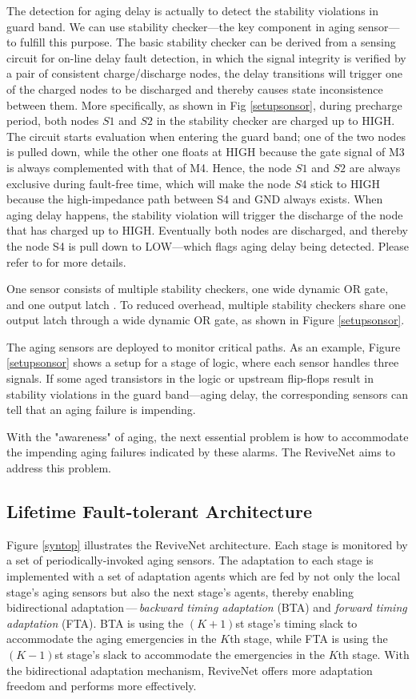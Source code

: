 The detection for aging delay is actually to detect the stability violations in guard band. We can use stability checker---the key component in aging sensor---to fulfill this purpose. The basic stability checker can be derived from a sensing circuit for on-line delay fault detection, in which the signal integrity is verified by a pair of consistent charge/discharge nodes, the delay transitions will trigger one of the charged nodes to be discharged and thereby causes state inconsistence between them. More specifically, as shown in Fig \ref{setupsonsor}, during precharge period, both nodes $S1$ and $S2$ in the stability checker are charged up to HIGH. The circuit starts evaluation when entering the guard band; one of the two nodes is pulled down, while the other one floats at HIGH because the gate signal of M3 is always complemented with that of M4. Hence, the node $S1$ and $S2$ are always exclusive during fault-free time, which will make the node $S4$ stick to HIGH because the high-impedance path between S4 and GND always exists. When aging delay happens, the stability violation will trigger the discharge of the node that has charged up to HIGH. Eventually both nodes are discharged, and thereby the node S4 is pull down to LOW---which flags aging delay being detected. Please refer to \cite{SVFD_09} for more details.

One sensor consists of multiple stability checkers, one wide dynamic OR gate, and one output latch \cite{SVFD_09}. To reduced overhead, multiple stability checkers share one output latch through a wide dynamic OR gate, as shown in Figure \ref{setupsonsor}.

The aging sensors are deployed to monitor critical paths. As an example, Figure \ref{setupsonsor} shows a setup for a stage of logic, where each sensor handles three signals. If some aged transistors in the logic or upstream flip-flops result in stability violations in the guard band---aging delay, the corresponding sensors can tell that an aging failure is impending.

With the "awareness" of aging, the next essential problem is how to accommodate the impending aging failures indicated by these alarms. The ReviveNet aims to address this problem.

\subsection{Lifetime Fault-tolerant Architecture}

Figure \ref{syntop} illustrates the ReviveNet architecture. Each stage is monitored by a set of periodically-invoked aging sensors. The adaptation to each stage is implemented with a set of adaptation agents which are fed by not only the local stage's aging sensors but also the next stage's agents, thereby enabling bidirectional adaptation\,---\,\emph{backward timing adaptation} (BTA) and \emph{forward timing adaptation} (FTA).  BTA is using the $(K+1)$st stage's timing slack to accommodate the aging emergencies in the $K$th stage, while FTA is using the $(K-1)$st stage's slack to accommodate the emergencies in the $K$th stage.  With the bidirectional adaptation mechanism, ReviveNet offers more adaptation freedom and performs more effectively.



